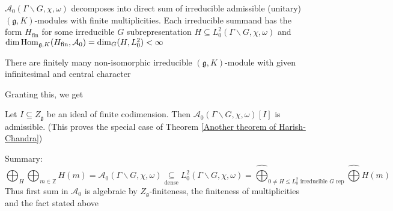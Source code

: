 \documentclass[../main.tex]{subfiles}
\begin{document}
\begin{corollary}\label{A_0 decomposes into direct sum of irreducible admissible (g,K) modules with finite multiplicities}
$\mathcal A_0(\Gamma\backslash G,\chi,\omega)$ decomposes into direct sum of irreducible admissible (unitary) $(\mathfrak g,K)$-modules with finite multiplicities. Each irreducible summand has the form $H_{\mathrm{fin}}$ for some irreducible $G$ subrepresentation $H\subseteq L_0^2(\Gamma\backslash G,\chi,\omega)$ and $\dim\operatorname{Hom}_{\mathfrak g,K}(H_{\mathrm{fin}},\mathcal A_0)=\dim _G(H,L_0^2)<\infty$
\end{corollary}

\begin{fact}
There are finitely many non-isomorphic irreducible $(\mathfrak g,K)$-module with given infinitesimal and central character
\end{fact}

Granting this, we get

\begin{corollary}
Let $I\subseteq Z_{\mathfrak g}$ be an ideal of finite codimension. Then $\mathcal A_0(\Gamma\backslash G,\chi,\omega)[I]$ is admissible. (This proves the special case of Theorem \ref{Another theorem of Harish-Chandra})
\end{corollary}

Summary:
\[\bigoplus_{H}\bigoplus_{m\in\mathbb Z}H(m)=\mathcal A_0(\Gamma\backslash G,\chi,\omega)\underset{\text{dense}}{\subseteq}L_0^2(\Gamma\backslash G,\chi,\omega)=\widehat{\bigoplus}_{0\neq H\leq L_0^2\text{ irreducible $G$ rep}}\widehat{\bigoplus}H(m)\]
Thus first sum in $\mathcal A_0$ is algebraic by $Z_{\mathfrak g}$-finiteness, the finiteness of multiplicities and the fact stated above
\end{document}
